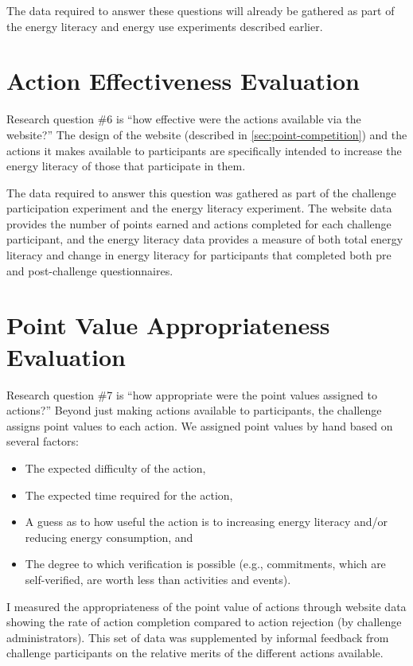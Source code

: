 The data required to answer these questions will already be gathered as part of the energy literacy and energy use experiments described earlier.


\section{Action Effectiveness Evaluation}

Research question \#6 is ``how effective were the actions available via the website?'' The design of the website (described in \autoref{sec:point-competition}) and the actions it makes available to participants are specifically intended to increase the energy literacy of those that participate in them.

The data required to answer this question was gathered as part of the challenge participation experiment and the energy literacy experiment. The website data provides the number of points earned and actions completed for each challenge participant, and the energy literacy data provides a measure of both total energy literacy and change in energy literacy for participants that completed both pre and post-challenge questionnaires.


\section{Point Value Appropriateness Evaluation}
\label{sec:exp-point-values}

Research question \#7 is ``how appropriate were the point values assigned to actions?'' Beyond just making actions available to participants, the challenge assigns point values to each action. We assigned point values by hand based on several factors:

\begin{itemize}
	\item The expected difficulty of the action,
	\item The expected time required for the action,
	\item A guess as to how useful the action is to increasing energy literacy and/or reducing energy consumption, and
	\item The degree to which verification is possible (e.g., commitments, which are self-verified, are worth less than activities and events).
\end{itemize}

I measured the appropriateness of the point value of actions through website data showing the rate of action completion compared to action rejection (by challenge administrators). This set of data was supplemented by informal feedback from challenge participants on the relative merits of the different actions available.


